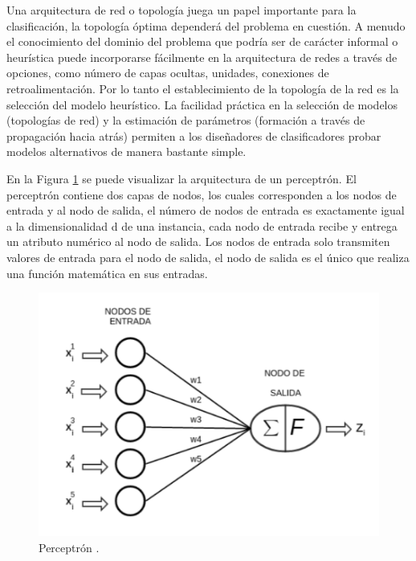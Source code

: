  Una arquitectura de red o topología juega un papel importante para la clasificación, la topología óptima dependerá del problema en cuestión. A menudo el conocimiento del dominio del problema que podría ser de carácter informal o heurística puede incorporarse fácilmente en la arquitectura de redes a través de opciones, como número de capas ocultas, unidades, conexiones de retroalimentación. Por lo tanto el establecimiento de la topología de la red es la selección del modelo heurístico. La facilidad práctica en la selección de modelos (topologías de red) y la estimación de parámetros (formación a través de propagación hacia atrás) permiten a los diseñadores de clasificadores probar modelos alternativos de manera bastante simple. \cite{PattClassi}


En la Figura \ref{fig:perceptron} se puede visualizar la arquitectura de un perceptrón. El perceptrón contiene dos capas de nodos, los cuales corresponden a los nodos de entrada y al nodo de salida, el número de nodos de entrada es exactamente igual a la dimensionalidad d de una instancia, cada nodo de entrada recibe y entrega un atributo numérico al nodo de salida. Los nodos de entrada solo transmiten valores de entrada para el nodo de salida, el nodo de salida es el único que realiza una función matemática en sus entradas.
\begin{figure}[ht]
 \centering
	\includegraphics[width=0.65\columnwidth]{chapter3/perceptron.png}
 \caption{Perceptrón \cite{aggarwal2015data}.}
 \label{fig:perceptron}
\end{figure}

